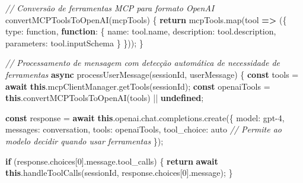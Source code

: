 \documentclass[
]{article}
\newenvironment{Shaded}{}{}
\newcommand{\AttributeTok}[1]{\textcolor[rgb]{0.49,0.56,0.16}{#1}}
\newcommand{\CommentTok}[1]{\textcolor[rgb]{0.38,0.63,0.69}{\textit{#1}}}
\newcommand{\ControlFlowTok}[1]{\textcolor[rgb]{0.00,0.44,0.13}{\textbf{#1}}}
\newcommand{\DataTypeTok}[1]{\textcolor[rgb]{0.56,0.13,0.00}{#1}}
\newcommand{\DecValTok}[1]{\textcolor[rgb]{0.25,0.63,0.44}{#1}}
\newcommand{\FunctionTok}[1]{\textcolor[rgb]{0.02,0.16,0.49}{#1}}
\newcommand{\KeywordTok}[1]{\textcolor[rgb]{0.00,0.44,0.13}{\textbf{#1}}}
\newcommand{\NormalTok}[1]{#1}
\newcommand{\OperatorTok}[1]{\textcolor[rgb]{0.40,0.40,0.40}{#1}}
\newcommand{\StringTok}[1]{\textcolor[rgb]{0.25,0.44,0.63}{#1}}
\begin{document}
\begin{Shaded}
\begin{Highlighting}[]
\CommentTok{// Conversão de ferramentas MCP para formato OpenAI}
\FunctionTok{convertMCPToolsToOpenAI}\NormalTok{(mcpTools) \{}
  \ControlFlowTok{return}\NormalTok{ mcpTools}\OperatorTok{.}\FunctionTok{map}\NormalTok{(tool }\KeywordTok{=\textgreater{}}\NormalTok{ (\{}
    \DataTypeTok{type}\OperatorTok{:} \StringTok{\textquotesingle{}function\textquotesingle{}}\OperatorTok{,}
    \KeywordTok{function}\OperatorTok{:}\NormalTok{ \{}
      \DataTypeTok{name}\OperatorTok{:}\NormalTok{ tool}\OperatorTok{.}\AttributeTok{name}\OperatorTok{,}
      \DataTypeTok{description}\OperatorTok{:}\NormalTok{ tool}\OperatorTok{.}\AttributeTok{description}\OperatorTok{,}
      \DataTypeTok{parameters}\OperatorTok{:}\NormalTok{ tool}\OperatorTok{.}\AttributeTok{inputSchema}
\NormalTok{    \}}
\NormalTok{  \}))}\OperatorTok{;}
\NormalTok{\}}

\CommentTok{// Processamento de mensagem com detecção automática de necessidade de ferramentas}
\KeywordTok{async} \FunctionTok{processUserMessage}\NormalTok{(sessionId}\OperatorTok{,}\NormalTok{ userMessage) \{}
  \KeywordTok{const}\NormalTok{ tools }\OperatorTok{=} \ControlFlowTok{await} \KeywordTok{this}\OperatorTok{.}\AttributeTok{mcpClientManager}\OperatorTok{.}\FunctionTok{getTools}\NormalTok{(sessionId)}\OperatorTok{;}
  \KeywordTok{const}\NormalTok{ openaiTools }\OperatorTok{=} \KeywordTok{this}\OperatorTok{.}\FunctionTok{convertMCPToolsToOpenAI}\NormalTok{(tools) }\OperatorTok{||} \KeywordTok{undefined}\OperatorTok{;}
  
  \KeywordTok{const}\NormalTok{ response }\OperatorTok{=} \ControlFlowTok{await} \KeywordTok{this}\OperatorTok{.}\AttributeTok{openai}\OperatorTok{.}\AttributeTok{chat}\OperatorTok{.}\AttributeTok{completions}\OperatorTok{.}\FunctionTok{create}\NormalTok{(\{}
    \DataTypeTok{model}\OperatorTok{:} \StringTok{\textquotesingle{}gpt{-}4\textquotesingle{}}\OperatorTok{,}
    \DataTypeTok{messages}\OperatorTok{:}\NormalTok{ conversation}\OperatorTok{,}
    \DataTypeTok{tools}\OperatorTok{:}\NormalTok{ openaiTools}\OperatorTok{,}
    \DataTypeTok{tool\_choice}\OperatorTok{:} \StringTok{\textquotesingle{}auto\textquotesingle{}}  \CommentTok{// Permite ao modelo decidir quando usar ferramentas}
\NormalTok{  \})}\OperatorTok{;}
  
  \ControlFlowTok{if}\NormalTok{ (response}\OperatorTok{.}\AttributeTok{choices}\NormalTok{[}\DecValTok{0}\NormalTok{]}\OperatorTok{.}\AttributeTok{message}\OperatorTok{.}\AttributeTok{tool\_calls}\NormalTok{) \{}
    \ControlFlowTok{return} \ControlFlowTok{await} \KeywordTok{this}\OperatorTok{.}\FunctionTok{handleToolCalls}\NormalTok{(sessionId}\OperatorTok{,}\NormalTok{ response}\OperatorTok{.}\AttributeTok{choices}\NormalTok{[}\DecValTok{0}\NormalTok{]}\OperatorTok{.}\AttributeTok{message}\NormalTok{)}\OperatorTok{;}
\NormalTok{  \}}
  

\end{Highlighting}
\end{Shaded}
\end{document}
